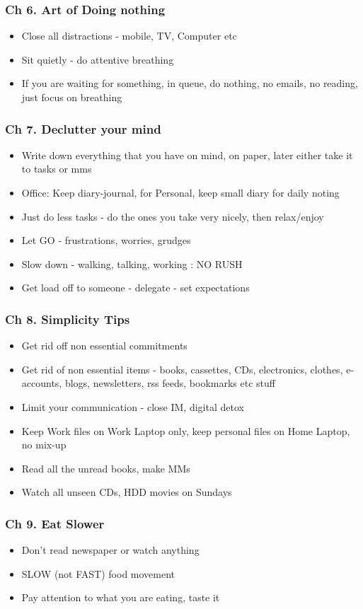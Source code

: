 \begin{frame}[fragile]
\frametitle{Ch 6. Art of Doing nothing}
\begin{itemize}
\item Close all distractions - mobile, TV, Computer etc
\item Sit quietly - do attentive breathing
\item If you are waiting for something, in queue, do nothing, no emails, no reading, just focus on breathing
\end{itemize}
\end{frame}

\begin{frame}[fragile]
\frametitle{Ch 7. Declutter your mind}
\begin{itemize}
\item Write down everything that you have on mind, on paper, later either take it to tasks or mms
\item Office: Keep diary-journal, for Personal, keep small diary for daily noting
\item Just do less tasks - do the ones you take very nicely, then relax/enjoy
\item Let GO - frustrations, worries, grudges
\item Slow down - walking, talking, working : NO RUSH
\item Get load off to someone - delegate - set expectations
\end{itemize}
\end{frame}

\begin{frame}[fragile]
\frametitle{Ch 8. Simplicity Tips}
\begin{itemize}
\item Get rid off non essential commitments
\item Get rid of non essential items - books, cassettes, CDs, electronics, clothes, e-accounts, blogs, newsletters, rss feeds, bookmarks etc stuff
\item Limit your communication - close IM, digital detox
\item Keep Work files on Work Laptop only, keep personal files on Home Laptop, no mix-up
\item Read all the unread books, make MMs
\item Watch all unseen CDs, HDD movies on Sundays
\end{itemize}
\end{frame}

\begin{frame}[fragile]
\frametitle{Ch 9. Eat Slower}
\begin{itemize}
\item Don't read newspaper or watch anything
\item SLOW (not FAST) food movement
\item Pay attention to what you are eating, taste it
\end{itemize}
\end{frame}


